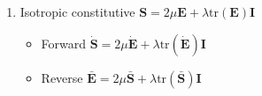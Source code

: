 \documentclass{article}
\begin{document}
\begin{enumerate}
\item Isotropic constitutive $\mathbf{S} = 2 \mu \mathbf{E} + \lambda \text{tr}(\mathbf{E}) \mathbf{I}$
\begin{itemize}
\item Forward $\dot{\mathbf{S}} = 2 \mu \dot{\mathbf{E}} + \lambda \text{tr}(\dot{\mathbf{E}}) \mathbf{I}$
\item Reverse $\bar{\mathbf{E}} = 2 \mu \bar{\mathbf{S}} + \lambda \text{tr}(\bar{\mathbf{S}}) \mathbf{I}$
\end{itemize}

\end{enumerate}
\end{document}

